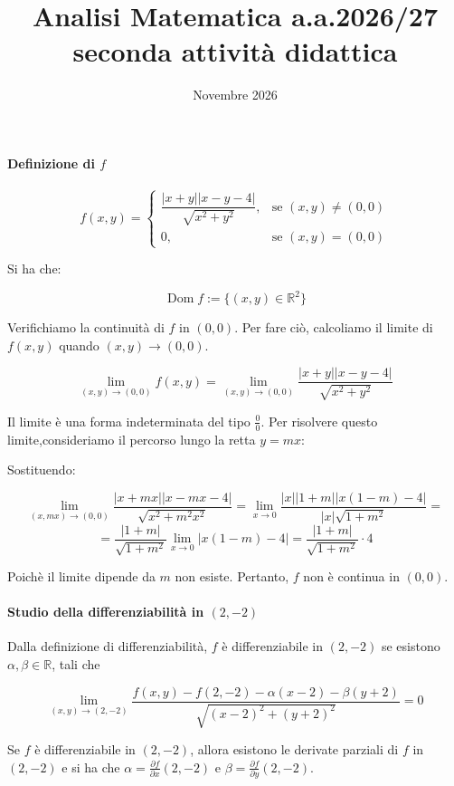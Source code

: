 \documentclass{article}
\title{Analisi Matematica a.a.2026/27
seconda attività didattica}
\date{Novembre 2026}
\begin{document}
\maketitle

\paragraph{Definizione di \(f\)}

\[
f(x,y) = 
\begin{cases}
    \dfrac{|x+y||x-y-4|}{\sqrt{x^2 + y^2}}, & \text{se } (x,y) \neq (0,0) \\[6pt]
    0, & \text{se } (x,y) = (0,0)
\end{cases}
\]

Si ha che:

\[
\operatorname{Dom}f := \{(x,y) \in \mathbb{R}^2 \}
\]

Verifichiamo la continuità di \(f\) in \((0,0)\). Per fare ciò, calcoliamo il limite di \(f(x,y)\) quando \((x,y) \to (0,0)\).

\[
\lim_{(x,y) \to (0,0)} f(x,y) = \lim_{(x,y) \to (0,0)} \frac{|x+y||x-y-4|}{\sqrt{x^2 + y^2}}
\]

Il limite è una forma indeterminata del tipo \(\frac{0}{0}\). Per risolvere questo limite,consideriamo il percorso lungo la retta \(y = mx\):

Sostituendo:

\[
\lim_{(x,mx) \to (0,0)} \frac{|x+mx||x-mx-4|}{\sqrt{x^2 + m^2x^2}} = \lim_{x \to 0} \frac{|x||1 + m||x(1-m) - 4|}{|x|\sqrt{1+m^2}} =
\]
\[
= \frac{|1+m|}{\sqrt{1+m^2}} \lim_{x \to 0} |x(1-m) - 4| =\frac{|1+m|}{\sqrt{1+m^2}} \cdot 4
\]

Poichè il limite dipende da \(m\) non esiste. Pertanto, \(f\) non è continua in \((0,0)\).

\paragraph{Studio della differenziabilità in \((2,-2)\)}

Dalla definizione di differenziabilità, \(f\) è differenziabile in \((2,-2)\) se esistono \(\alpha, \beta \in \mathbb{R}\), tali che

\[
\lim_{(x,y) \to (2,-2)} \frac{f(x,y) - f(2, -2) - \alpha(x-2) - \beta(y+2)}{\sqrt{{(x-2)}^2 + {(y+2)}^2}} = 0
\]

Se \(f\) è differenziabile in \((2,-2)\), allora esistono le derivate parziali di \(f\) in \((2,-2)\) e si ha che \(\alpha = \frac{\partial f}{\partial x}(2,-2)\) e \(\beta = \frac{\partial f}{\partial y}(2,-2)\).
\end{document}
